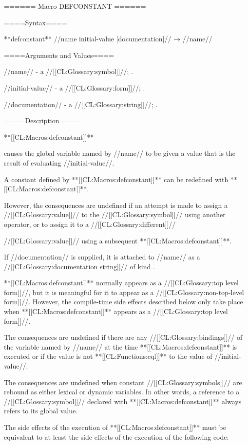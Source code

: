 ====== Macro DEFCONSTANT ======

====Syntax====

**defconstant** //name initial-value [documentation]// → //name//

====Arguments and Values====

//name// - a //[[CL:Glossary:symbol]]//; \noeval.

//initial-value// - a //[[CL:Glossary:form]]//; \eval.

//documentation// - a //[[CL:Glossary:string]]//; \noeval.

====Description====

**[[CL:Macros:defconstant]]**

causes the global variable named by //name// to be given a value that is the result of evaluating //initial-value//.

A constant defined by **[[CL:Macros:defconstant]]** can be redefined with **[[CL:Macros:defconstant]]**.

However, the consequences are undefined if an attempt is made to assign a //[[CL:Glossary:value]]// to the //[[CL:Glossary:symbol]]// using another operator, or to assign it to a //[[CL:Glossary:different]]//

//[[CL:Glossary:value]]// using a subsequent **[[CL:Macros:defconstant]]**.

If //documentation// is supplied, it is attached to //name// as a //[[CL:Glossary:documentation string]]// of kind .

**[[CL:Macros:defconstant]]** normally appears as a //[[CL:Glossary:top level form]]//, but it is meaningful for it to appear as a //[[CL:Glossary:non-top-level form]]//. However, the compile-time side effects described below only take place when **[[CL:Macros:defconstant]]** appears as a //[[CL:Glossary:top level form]]//.



The consequences are undefined if there are any //[[CL:Glossary:bindings]]// of the variable named by //name// at the time **[[CL:Macros:defconstant]]** is executed or if the value is not **[[CL:Functions:eql]]** to the value of //initial-value//.

The consequences are undefined when constant //[[CL:Glossary:symbols]]// are rebound as either lexical or dynamic variables. In other words, a reference to a //[[CL:Glossary:symbol]]// declared with **[[CL:Macros:defconstant]]** always refers to its global value.


The side effects of the execution of **[[CL:Macros:defconstant]]** must be equivalent to at least the side effects of the execution of the following code:


